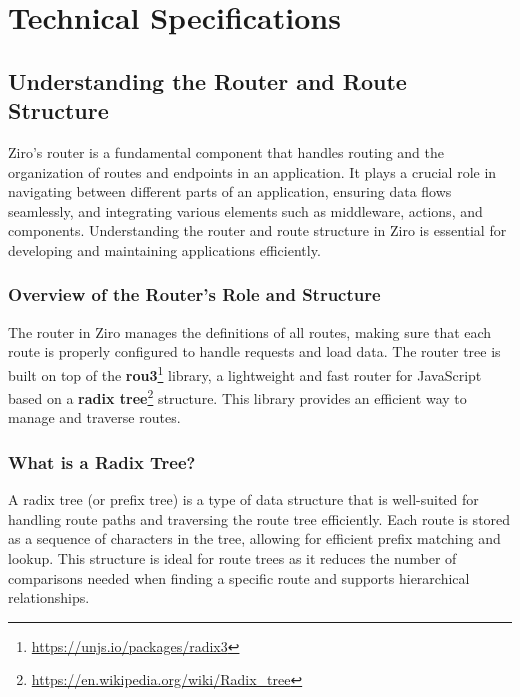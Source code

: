 \section{Technical Specifications} %


\subsection{Understanding the Router and Route Structure}

Ziro's router is a fundamental component that handles routing and the organization of routes and endpoints in an application. It plays a crucial role in navigating between different parts of an application, ensuring data flows seamlessly, and integrating various elements such as middleware, actions, and components. Understanding the router and route structure in Ziro is essential for developing and maintaining applications efficiently.

\subsubsection{Overview of the Router's Role and Structure}
The router in Ziro manages the definitions of all routes, making sure that each route is properly configured to handle requests and load data. The router tree is built on top of the \textbf{rou3}\footnote{\url{https://unjs.io/packages/radix3}} library, a lightweight and fast router for JavaScript based on a \textbf{radix tree}\footnote{\url{https://en.wikipedia.org/wiki/Radix_tree}} structure. This library provides an efficient way to manage and traverse routes.

\subsubsection{What is a Radix Tree?}
A radix tree (or prefix tree) is a type of data structure that is well-suited for handling route paths and traversing the route tree efficiently. Each route is stored as a sequence of characters in the tree, allowing for efficient prefix matching and lookup. This structure is ideal for route trees as it reduces the number of comparisons needed when finding a specific route and supports hierarchical relationships.

